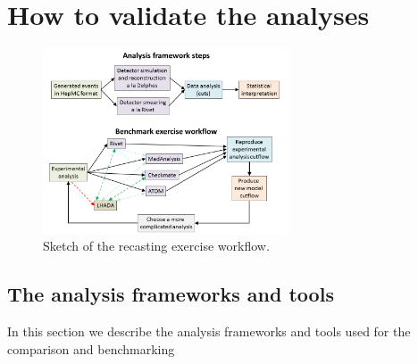 \documentclass[11pt]{cernrep}
\begin{document}
\section{How to validate the analyses}
\begin{figure}
\begin{center}
\includegraphics[width=0.65\textwidth]{figures/lhada_benchmarking_excersise.png}
 \caption{Sketch of the recasting exercise workflow.
}
\label{fig:exercise}
\end{center}
\end{figure}


\subsection{The analysis frameworks and tools}
In this section we describe the analysis frameworks and tools used for the comparison and benchmarking
\end{document}
